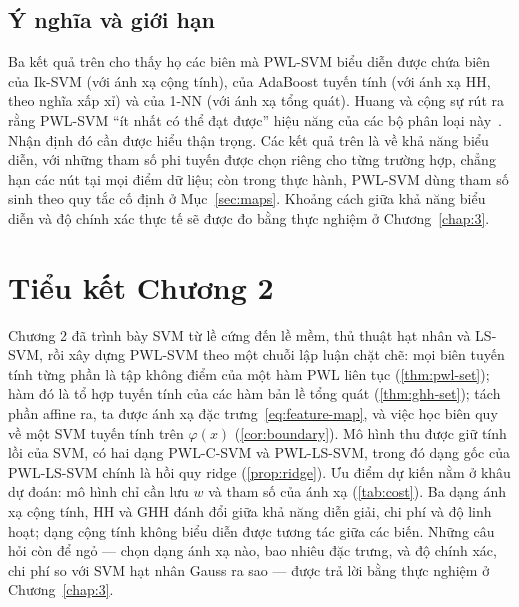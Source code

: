 \subsection{Ý nghĩa và giới hạn}

Ba kết quả trên cho thấy họ các biên mà PWL-SVM biểu diễn được chứa biên của Ik-SVM (với ánh xạ cộng tính), của AdaBoost tuyến tính (với ánh xạ HH, theo nghĩa xấp xỉ) và của 1-NN (với ánh xạ tổng quát). Huang và cộng sự rút ra rằng PWL-SVM “ít nhất có thể đạt được” hiệu năng của các bộ phân loại này~\cite{huang2013}. Nhận định đó cần được hiểu thận trọng. Các kết quả trên là về khả năng biểu diễn, với những tham số phi tuyến được chọn riêng cho từng trường hợp, chẳng hạn các nút tại mọi điểm dữ liệu; còn trong thực hành, PWL-SVM dùng tham số sinh theo quy tắc cố định ở Mục~\ref{sec:maps}. Khoảng cách giữa khả năng biểu diễn và độ chính xác thực tế sẽ được đo bằng thực nghiệm ở Chương~\ref{chap:3}.

\section*{Tiểu kết Chương 2}

Chương 2 đã trình bày SVM từ lề cứng đến lề mềm, thủ thuật hạt nhân và LS-SVM, rồi xây dựng PWL-SVM theo một chuỗi lập luận chặt chẽ: mọi biên tuyến tính từng phần là tập không điểm của một hàm PWL liên tục (\cref{thm:pwl-set}); hàm đó là tổ hợp tuyến tính của các hàm bản lề tổng quát (\cref{thm:ghh-set}); tách phần affine ra, ta được ánh xạ đặc trưng~\eqref{eq:feature-map}, và việc học biên quy về một SVM tuyến tính trên $\varphi(x)$ (\cref{cor:boundary}). Mô hình thu được giữ tính lồi của SVM, có hai dạng PWL-C-SVM và PWL-LS-SVM, trong đó dạng gốc của PWL-LS-SVM chính là hồi quy ridge (\cref{prop:ridge}). Ưu điểm dự kiến nằm ở khâu dự đoán: mô hình chỉ cần lưu $w$ và tham số của ánh xạ (\cref{tab:cost}). Ba dạng ánh xạ cộng tính, HH và GHH đánh đổi giữa khả năng diễn giải, chi phí và độ linh hoạt; dạng cộng tính không biểu diễn được tương tác giữa các biến. Những câu hỏi còn để ngỏ --- chọn dạng ánh xạ nào, bao nhiêu đặc trưng, và độ chính xác, chi phí so với SVM hạt nhân Gauss ra sao --- được trả lời bằng thực nghiệm ở Chương~\ref{chap:3}.
